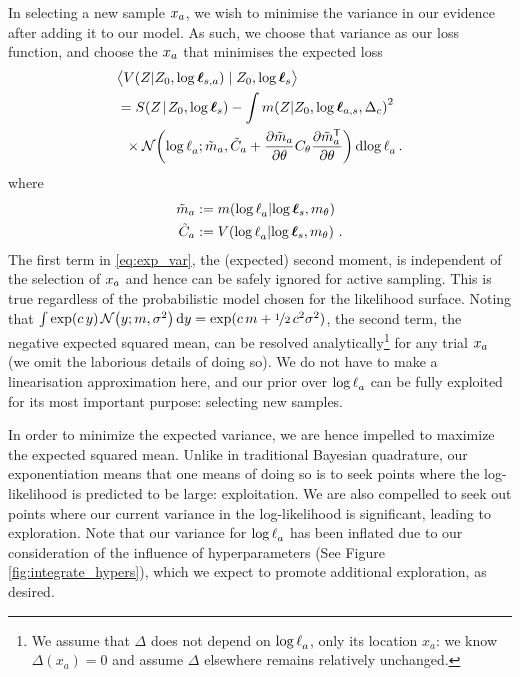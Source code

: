 \documentclass{article}
\begin{document}
In selecting a new sample $\lfv_a$, we wish to minimise the variance in our evidence after adding it to our model. As such, we choose that variance as our loss function, and choose the $\lfv_a$ that minimises the expected loss
\begin{align}
&\bigl\langle \cov{\If}{Z_0,\tvr_{s,a}}\mid Z_0,\tvr_{s}\bigr\rangle 
\nonumber\\
 & = \secm{\If}{Z_0,\tvr_s} 
 - \int\mean{\If}{Z_0,\tvr_{a,s},\Delta_c}^2\nonumber\\
& \hspace{0.2cm}
\times\N{\tr_a}
{\tilde{m}_a }
{\tilde{C}_a +\pderiv{\tilde{m}_a}{\theta}C_\theta\pderiv{\tilde{m}\tra_a}{\theta}}
\ud\tr_a\,.\label{eq:exp_var}
\end{align}
where
\begin{align*}
\tilde{m}_a & \deq \mean{\tr_a}{\tvr_s,m_\theta}\\
\tilde{C}_a & \deq \cov{\tr_a}{\tvr_s,m_\theta}\,.
\end{align*}
The first term in \eqref{eq:exp_var}, the (expected) second moment, is independent of the selection of $\lfv_a$ and hence can be safely ignored for active sampling. This is true regardless of the probabilistic model chosen for the likelihood surface. 
Noting that $\int \exp(c\, y)\, \N{y}{m}{\sigma^2} \ud y = \exp(c\, m + \nicefrac{1}{2}\, c^2 \sigma^2)$, 
the second term, the negative expected squared mean, can be resolved analytically\footnote{We assume that $\Delta$ does not depend on $\tr_a$, only its location $x_a$: we know $\Delta(x_a) = 0$ and assume $\Delta$ elsewhere remains relatively unchanged.}
 for any trial $\lfv_a$ (we omit the laborious details of doing so). We do not have to make a linearisation approximation here, and our prior over $\tr_a$ can be fully exploited for its most important purpose: selecting new samples. 

In order to minimize the expected variance, we are hence impelled to maximize the expected squared mean. Unlike in traditional Bayesian quadrature, our exponentiation means that one means of doing so is to seek points where the log-likelihood is predicted to be large: exploitation. We are also compelled to seek out points where our current variance in the log-likelihood is significant, leading to exploration. Note that our variance for $\tr_a$ has been inflated due to our consideration of the influence of hyperparameters (See Figure \ref{fig:integrate_hypers}), which we expect to promote additional exploration, as desired.
\end{document}
